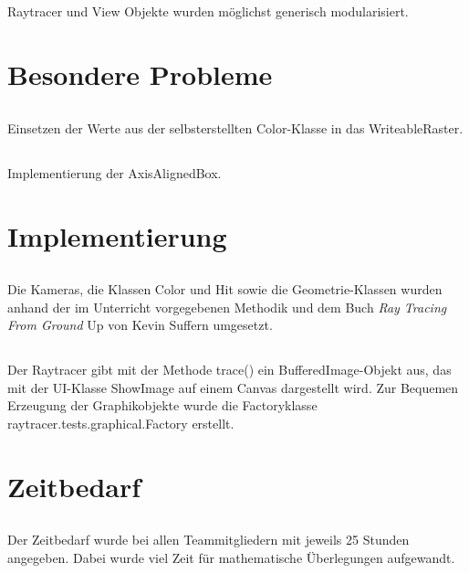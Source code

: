 \documentclass[11pt]{amsart}
\begin{document}
\subsection{}
Raytracer und View Objekte wurden m\"oglichst generisch modularisiert.


\section{Besondere Probleme}
\subsection{}
Einsetzen der Werte aus der selbsterstellten Color-Klasse in das WriteableRaster.

\subsection{}
Implementierung der AxisAlignedBox.


\section{Implementierung}
\subsection{}
Die Kameras, die Klassen Color und Hit sowie die Geometrie-Klassen wurden 
anhand der im Unterricht vorgegebenen Methodik und dem Buch 
\textit{Ray Tracing From Ground} Up von Kevin Suffern
umgesetzt. 

\subsection{}
Der Raytracer gibt mit der Methode trace() ein BufferedImage-Objekt aus, das mit der UI-Klasse ShowImage auf einem Canvas dargestellt wird.
Zur Bequemen Erzeugung der Graphikobjekte wurde die Factoryklasse raytracer.tests.graphical.Factory erstellt.


\section{Zeitbedarf}
\subsection{}
Der Zeitbedarf wurde bei allen Teammitgliedern mit jeweils 25 Stunden angegeben. Dabei 
wurde viel Zeit f\"ur mathematische \"Uberlegungen aufgewandt.
\end{document}
